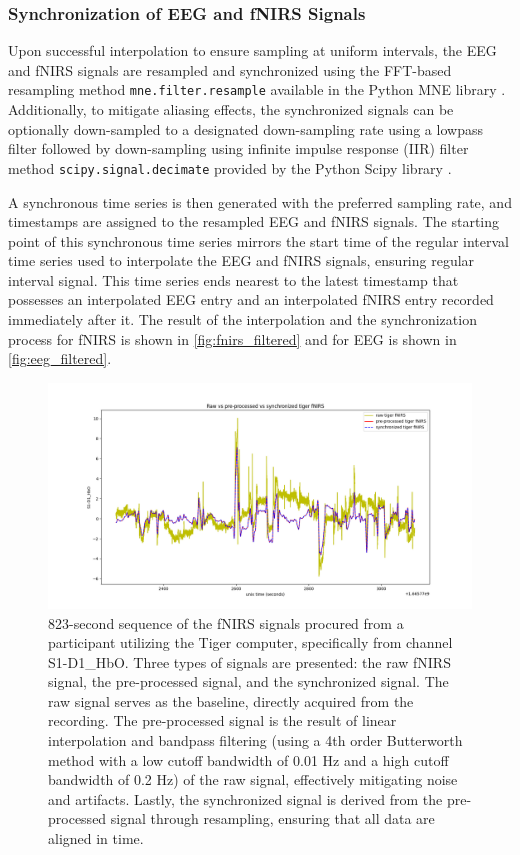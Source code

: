 \subsubsection{Synchronization of EEG and fNIRS Signals}

Upon successful interpolation to ensure sampling at uniform intervals, the EEG and fNIRS signals are resampled and synchronized using the FFT-based resampling method \texttt{mne.filter.resample} available in the Python MNE library \cite{GramfortEtAl2013a}. Additionally, to mitigate aliasing effects, the synchronized signals can be optionally down-sampled to a designated down-sampling rate using a lowpass filter followed by down-sampling using infinite impulse response (IIR) filter method \texttt{scipy.signal.decimate} provided by the Python Scipy library \cite{2020SciPy-NMeth}.

A synchronous time series is then generated with the preferred sampling rate, and timestamps are assigned to the resampled EEG and fNIRS signals. The starting point of this synchronous time series mirrors the start time of the regular interval time series used to interpolate the EEG and fNIRS signals, ensuring regular interval signal. This time series ends nearest to the latest timestamp that possesses an interpolated EEG entry and an interpolated fNIRS entry recorded immediately after it. The result of the interpolation and the synchronization process for fNIRS is shown in \autoref{fig:fnirs_filtered} and for EEG is shown in \autoref{fig:eeg_filtered}.

\begin{figure}[h]
  \centering
  \includegraphics[width=\textwidth]{images/fnirs_filtered}
  \caption{823-second sequence of the fNIRS signals procured from a participant utilizing the Tiger computer, specifically from channel S1-D1\_HbO. Three types of signals are presented: the raw fNIRS signal, the pre-processed signal, and the synchronized signal. The raw signal serves as the baseline, directly acquired from the recording. The pre-processed signal is the result of linear interpolation and bandpass filtering (using a 4th order Butterworth method with a low cutoff bandwidth of 0.01 Hz and a high cutoff bandwidth of 0.2 Hz) of the raw signal, effectively mitigating noise and artifacts. Lastly, the synchronized signal is derived from the pre-processed signal through resampling, ensuring that all data are aligned in time.}
  \label{fig:fnirs_filtered}
\end{figure}

